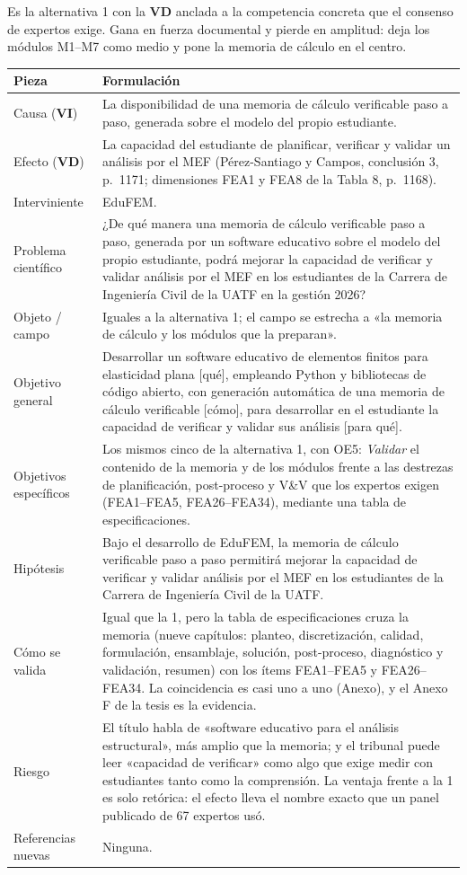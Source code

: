 \documentclass[11pt,a4paper]{article}
\newcommand{\vi}{\textbf{VI}}
\newcommand{\vd}{\textbf{VD}}
\begin{document}
Es la alternativa 1 con la \vd{} anclada a la competencia concreta que el consenso de expertos exige. Gana en fuerza documental y pierde en amplitud: deja los módulos M1--M7 como medio y pone la memoria de cálculo en el centro.

\begin{longtable}{L{3.4cm}L{12.4cm}}
\toprule
\textbf{Pieza} & \textbf{Formulación} \\
\midrule
\endhead
Causa (\vi) & La disponibilidad de una memoria de cálculo verificable paso a paso, generada sobre el modelo del propio estudiante. \\
Efecto (\vd) & La capacidad del estudiante de planificar, verificar y validar un análisis por el MEF (Pérez-Santiago y Campos, conclusión 3, p.~1171; dimensiones FEA1 y FEA8 de la Tabla 8, p.~1168). \\
Interviniente & EduFEM. \\
Problema científico & ¿De qué manera una memoria de cálculo verificable paso a paso, generada por un software educativo sobre el modelo del propio estudiante, podrá mejorar la capacidad de verificar y validar análisis por el MEF en los estudiantes de la Carrera de Ingeniería Civil de la UATF en la gestión 2026? \\
Objeto / campo & Iguales a la alternativa 1; el campo se estrecha a «la memoria de cálculo y los módulos que la preparan». \\
Objetivo general & Desarrollar un software educativo de elementos finitos para elasticidad plana [qué], empleando Python y bibliotecas de código abierto, con generación automática de una memoria de cálculo verificable [cómo], para desarrollar en el estudiante la capacidad de verificar y validar sus análisis [para qué]. \\
Objetivos específicos & Los mismos cinco de la alternativa 1, con OE5: \emph{Validar} el contenido de la memoria y de los módulos frente a las destrezas de planificación, post-proceso y V\&V que los expertos exigen (FEA1--FEA5, FEA26--FEA34), mediante una tabla de especificaciones. \\
Hipótesis & Bajo el desarrollo de EduFEM, la memoria de cálculo verificable paso a paso permitirá mejorar la capacidad de verificar y validar análisis por el MEF en los estudiantes de la Carrera de Ingeniería Civil de la UATF. \\
Cómo se valida & Igual que la 1, pero la tabla de especificaciones cruza la memoria (nueve capítulos: planteo, discretización, calidad, formulación, ensamblaje, solución, post-proceso, diagnóstico y validación, resumen) con los ítems FEA1--FEA5 y FEA26--FEA34. La coincidencia es casi uno a uno (Anexo), y el Anexo F de la tesis es la evidencia. \\
Riesgo & El título habla de «software educativo para el análisis estructural», más amplio que la memoria; y el tribunal puede leer «capacidad de verificar» como algo que exige medir con estudiantes tanto como la comprensión. La ventaja frente a la 1 es solo retórica: el efecto lleva el nombre exacto que un panel publicado de 67 expertos usó. \\
Referencias nuevas & Ninguna. \\
\bottomrule
\end{longtable}
\end{document}
